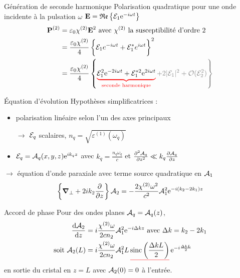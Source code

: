 \documentclass{beamer}
\begin{document}
\begin{frame}{Génération de seconde harmonique}
Polarisation quadratique pour une onde incidente à la pulsation $\omega$ $\v E = \mathfrak{Re} \left\{ \E_1 \e{-i\omega t} \right\}$
\begin{align*}
\v P^{(2)} &= \varepsilon_0 \chi^{(2)} \v E^2 \text{ avec $\chi^{(2)}$ la susceptibilité d'ordre 2}\\
&= \frac{\varepsilon_0 \chi^{(2)}}{4} \left\{\mathcal E_1 e^{-i\omega t} + \mathcal E_1^* e^{i\omega t} \vphantom{\frac12}\right\}^2 \\
&= \frac{\varepsilon_0 \chi^{(2)}}{4} \left\{\ubrace{red}{\mathcal E_1^2 \e{-2i\omega t} + \E_1^{*2} \e{2i\omega t}}{seconde harmonique}
\color{gray} + 2|\mathcal E_1|^2 + \mathcal O(\E_2^2) \vphantom{\frac12} \right\} 
\end{align*}
\end{frame}

\begin{frame}{Équation d'évolution}
Hypothèses simplificatrices :
\begin{itemize}
\item polarisation linéaire selon l'un des axes principaux
\item[$\rightarrow$] $\E_q$ scalaires, $n_q = \sqrt{ \varepsilon^{(1)}(\omega_q)}$
\item $\E_q = \A_q(x,y,z) \e{ik_qz}$ avec $k_q =\frac{n_q \omega_q}{c}$ et $\frac{\partial^2 \A_q}{\partial z^2} \ll k_q \frac{\partial \A_q}{\partial z}$
\end{itemize}
$\boldsymbol \rightarrow$ équation d'onde paraxiale avec terme source quadratique en $\A_1$
\begin{equation*}
\left\{\v\nabla_\bot + 2 i k_2 \frac{\partial}{\partial z} \right\} \A_2 = - \frac{2 \chi^{(2)} \omega^2}{c^2} \A_1^2 \e{- i (k_2 - 2k_1) z}
\end{equation*}
\end{frame}

\begin{frame}{Accord de phase}
Pour des ondes planes $\A_q = \A_q(z)$,
\begin{align*}
	\dv{\A_2}{z} &= i\frac{\chi^{(2)}\omega}{2cn_2} \A_1^2 \e{-i \Delta k z} \text{ avec } {\Delta k = k_2 - 2k_1} \label{eq:pwe} \\
	\text{soit } \A_2(L) &= i \frac{\chi^{(2)}\omega}{2 cn_2} \A_1^2 L\, \uline{red}{\operatorname{sinc}\left( \frac{\Delta k L}{2} \right)}\, \e{-i\frac{\Delta k L}{2}}
\end{align*}
en sortie du cristal en $z=L$ avec $\A_2(0)=0$ à l'entrée.
\end{frame}
\end{document}

